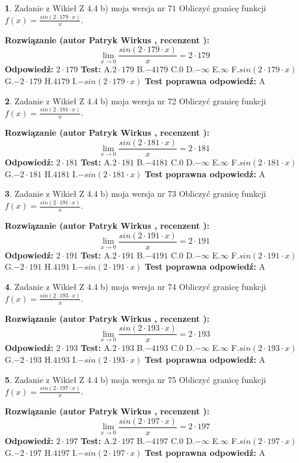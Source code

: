 \documentclass[12pt, a4paper]{article}
\theoremstyle{definition} %
\newtheorem{zad}{}
\newcommand{\zadStart}[1]{\begin{zad}#1\newline}
\newcommand{\zadStop}{\end{zad}}
\newcommand{\rozwStart}[2]{\noindent \textbf{Rozwiązanie (autor #1 , recenzent #2): }\newline}
\newcommand{\rozwStop}{\newline}
\newcommand{\odpStart}{\noindent \textbf{Odpowiedź:}\newline}
\newcommand{\odpStop}{\newline}
\newcommand{\testStart}{\noindent \textbf{Test:}\newline}
\newcommand{\testStop}{\newline}
\newcommand{\kluczStart}{\noindent \textbf{Test poprawna odpowiedź:}\newline}
\newcommand{\kluczStop}{\newline}
\begin{document}
\zadStart{Zadanie z Wikieł Z 4.4 b) moja wersja nr 71}
Obliczyć granicę funkcji $f(x)=\frac{sin(2 \cdot179\cdot x)}{x}$.
\zadStop
\rozwStart{Patryk Wirkus}{}
$$\lim\limits_{x\to 0}\frac{sin(2 \cdot 179\cdot x)}{x}=
2 \cdot 179$$
\rozwStop
\odpStart
$2 \cdot 179$
\odpStop
\testStart
A.$2 \cdot 179$
B.$-4179$
C.$0$
D.$-\infty$
E.$\infty$
F.$sin(2 \cdot 179\cdot x)$
G.$-2 \cdot 179$
H.$4179$
I.$-sin(2 \cdot 179\cdot x)$
\testStop
\kluczStart
A
\kluczStop



\zadStart{Zadanie z Wikieł Z 4.4 b) moja wersja nr 72}
Obliczyć granicę funkcji $f(x)=\frac{sin(2 \cdot181\cdot x)}{x}$.
\zadStop
\rozwStart{Patryk Wirkus}{}
$$\lim\limits_{x\to 0}\frac{sin(2 \cdot 181\cdot x)}{x}=
2 \cdot 181$$
\rozwStop
\odpStart
$2 \cdot 181$
\odpStop
\testStart
A.$2 \cdot 181$
B.$-4181$
C.$0$
D.$-\infty$
E.$\infty$
F.$sin(2 \cdot 181\cdot x)$
G.$-2 \cdot 181$
H.$4181$
I.$-sin(2 \cdot 181\cdot x)$
\testStop
\kluczStart
A
\kluczStop



\zadStart{Zadanie z Wikieł Z 4.4 b) moja wersja nr 73}
Obliczyć granicę funkcji $f(x)=\frac{sin(2 \cdot191\cdot x)}{x}$.
\zadStop
\rozwStart{Patryk Wirkus}{}
$$\lim\limits_{x\to 0}\frac{sin(2 \cdot 191\cdot x)}{x}=
2 \cdot 191$$
\rozwStop
\odpStart
$2 \cdot 191$
\odpStop
\testStart
A.$2 \cdot 191$
B.$-4191$
C.$0$
D.$-\infty$
E.$\infty$
F.$sin(2 \cdot 191\cdot x)$
G.$-2 \cdot 191$
H.$4191$
I.$-sin(2 \cdot 191\cdot x)$
\testStop
\kluczStart
A
\kluczStop



\zadStart{Zadanie z Wikieł Z 4.4 b) moja wersja nr 74}
Obliczyć granicę funkcji $f(x)=\frac{sin(2 \cdot193\cdot x)}{x}$.
\zadStop
\rozwStart{Patryk Wirkus}{}
$$\lim\limits_{x\to 0}\frac{sin(2 \cdot 193\cdot x)}{x}=
2 \cdot 193$$
\rozwStop
\odpStart
$2 \cdot 193$
\odpStop
\testStart
A.$2 \cdot 193$
B.$-4193$
C.$0$
D.$-\infty$
E.$\infty$
F.$sin(2 \cdot 193\cdot x)$
G.$-2 \cdot 193$
H.$4193$
I.$-sin(2 \cdot 193\cdot x)$
\testStop
\kluczStart
A
\kluczStop



\zadStart{Zadanie z Wikieł Z 4.4 b) moja wersja nr 75}
Obliczyć granicę funkcji $f(x)=\frac{sin(2 \cdot197\cdot x)}{x}$.
\zadStop
\rozwStart{Patryk Wirkus}{}
$$\lim\limits_{x\to 0}\frac{sin(2 \cdot 197\cdot x)}{x}=
2 \cdot 197$$
\rozwStop
\odpStart
$2 \cdot 197$
\odpStop
\testStart
A.$2 \cdot 197$
B.$-4197$
C.$0$
D.$-\infty$
E.$\infty$
F.$sin(2 \cdot 197\cdot x)$
G.$-2 \cdot 197$
H.$4197$
I.$-sin(2 \cdot 197\cdot x)$
\testStop
\kluczStart
A
\kluczStop
\end{document}
